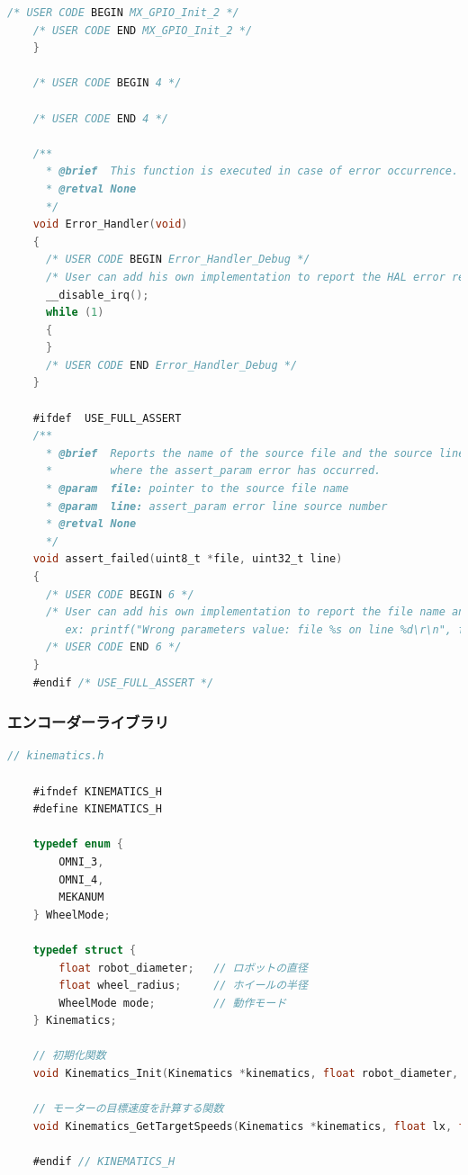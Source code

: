 \begin{lstlisting}[language=C, caption=メインコード(main.c)]
    /* USER CODE BEGIN MX_GPIO_Init_2 */
    /* USER CODE END MX_GPIO_Init_2 */
    }
    
    /* USER CODE BEGIN 4 */
    
    /* USER CODE END 4 */
    
    /**
      * @brief  This function is executed in case of error occurrence.
      * @retval None
      */
    void Error_Handler(void)
    {
      /* USER CODE BEGIN Error_Handler_Debug */
      /* User can add his own implementation to report the HAL error return state */
      __disable_irq();
      while (1)
      {
      }
      /* USER CODE END Error_Handler_Debug */
    }
    
    #ifdef  USE_FULL_ASSERT
    /**
      * @brief  Reports the name of the source file and the source line number
      *         where the assert_param error has occurred.
      * @param  file: pointer to the source file name
      * @param  line: assert_param error line source number
      * @retval None
      */
    void assert_failed(uint8_t *file, uint32_t line)
    {
      /* USER CODE BEGIN 6 */
      /* User can add his own implementation to report the file name and line number,
         ex: printf("Wrong parameters value: file %s on line %d\r\n", file, line) */
      /* USER CODE END 6 */
    }
    #endif /* USE_FULL_ASSERT */

\end{lstlisting}

\subsubsection{エンコーダーライブラリ}

\begin{lstlisting}[language=C, caption=エンコーダーライブラリ(encoder.h)]
    // kinematics.h

    #ifndef KINEMATICS_H
    #define KINEMATICS_H
    
    typedef enum {
        OMNI_3,
        OMNI_4,
        MEKANUM
    } WheelMode;
    
    typedef struct {
        float robot_diameter;   // ロボットの直径
        float wheel_radius;     // ホイールの半径
        WheelMode mode;         // 動作モード
    } Kinematics;
    
    // 初期化関数
    void Kinematics_Init(Kinematics *kinematics, float robot_diameter, float wheel_radius, WheelMode mode);
    
    // モーターの目標速度を計算する関数
    void Kinematics_GetTargetSpeeds(Kinematics *kinematics, float lx, float ly, float rx, float *speedFR, float *speedFL, float *speedBR, float *speedBL);
    
    #endif // KINEMATICS_H
\end{lstlisting}

